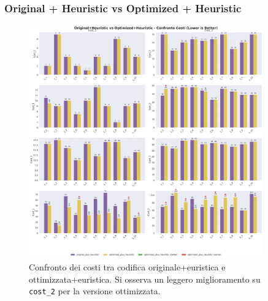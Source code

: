 \documentclass[11pt,a4paper]{article}
\begin{document}
\subsubsection{Original + Heuristic vs Optimized + Heuristic}
\begin{figure}[H]
  \centering
  \includegraphics[width=0.9\textwidth]{../Results/graphs/cost_comparison_heuristic.png}
  \caption{Confronto dei costi tra codifica originale+euristica e ottimizzata+euristica. 
  Si osserva un leggero miglioramento su \texttt{cost\_2} per la versione ottimizzata.}
\end{figure}
\end{document}
